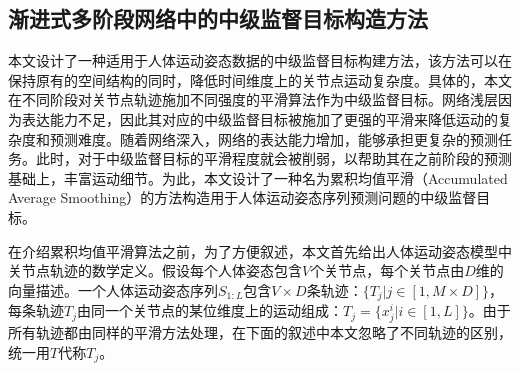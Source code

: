 \subsection{渐进式多阶段网络中的中级监督目标构造方法}
本文设计了一种适用于人体运动姿态数据的中级监督目标构建方法，该方法可以在保持原有的空间结构的同时，降低时间维度上的关节点运动复杂度。具体的，本文在不同阶段对关节点轨迹施加不同强度的平滑算法作为中级监督目标。网络浅层因为表达能力不足，因此其对应的中级监督目标被施加了更强的平滑来降低运动的复杂度和预测难度。随着网络深入，网络的表达能力增加，能够承担更复杂的预测任务。此时，对于中级监督目标的平滑程度就会被削弱，以帮助其在之前阶段的预测基础上，丰富运动细节。为此，本文设计了一种名为累积均值平滑（Accumulated Average Smoothing）的方法构造用于人体运动姿态序列预测问题的中级监督目标。

在介绍累积均值平滑算法之前，为了方便叙述，本文首先给出人体运动姿态模型中关节点轨迹的数学定义。假设每个人体姿态包含$V$个关节点，每个关节点由$D$维的向量描述。一个人体运动姿态序列$S_{1:L}$包含$V \times D$条轨迹：$\{T_j|j\in[1, M\times D]\}$，每条轨迹$T_j$由同一个关节点的某位维度上的运动组成：$T_j=\{x^i_j|i\in[1,L]\}$。由于所有轨迹都由同样的平滑方法处理，在下面的叙述中本文忽略了不同轨迹的区别，统一用$T$代称$T_j$。

